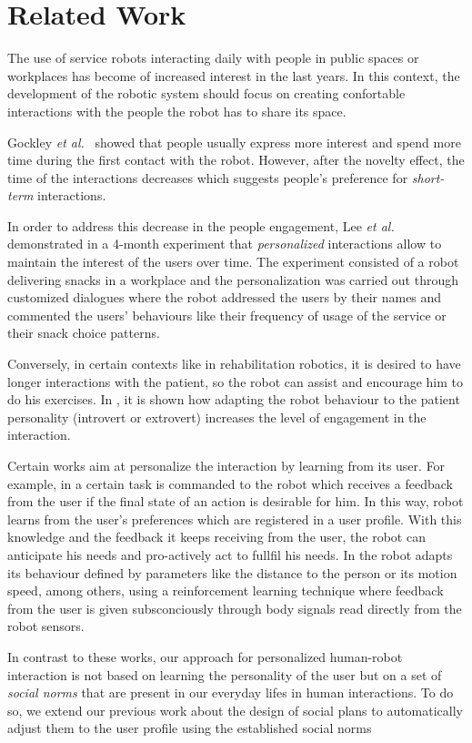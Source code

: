 \section{Related Work}

The use of service robots interacting daily with people in public
spaces or workplaces has become of increased interest in the last
years.
In this context, the development of the robotic system should focus on
creating confortable interactions with the people the robot has to
share its space.

Gockley \textit{et al.}~\cite{gockley2005} showed that people usually
express more interest and spend more time during the first contact
with the robot. However, after the novelty effect, the time of the
interactions decreases which suggests people's preference for
\textit{short-term} interactions.

In order to address this decrease in the people engagement, Lee
\textit{et al.}~\cite{Lee2012} demonstrated in a 4-month experiment
that \textit{personalized} interactions allow to maintain the interest of the
users over time.  The experiment consisted of a robot delivering
snacks in a workplace and the personalization was carried out through
customized dialogues where the robot addressed the users by their
names and commented the users' behaviours like their frequency of
usage of the service or their snack choice patterns.

Conversely, in certain contexts like in rehabilitation robotics, it is
desired to have longer interactions with the patient, so the robot can
assist and encourage him to do his exercises. In \cite{tapus2008}, it
is shown how adapting the robot behaviour to the patient personality
(introvert or extrovert) increases the level of engagement in the
interaction.

Certain works aim at personalize the interaction by learning from its
user. For example, in \cite{mason2011robot} a certain task is
commanded to the robot which receives a feedback from the user if the
final state of an action is desirable for him.  In this way, robot
learns from the user's preferences which are registered in a user
profile. With this knowledge and the feedback it keeps receiving from
the user, the robot can anticipate his needs and pro-actively act to
fullfil his needs.  In \cite{mitsunaga2008adapting} the robot adapts
its behaviour defined by parameters like the distance to the person or
its motion speed, among others, using a reinforcement learning technique
where feedback from the user is given subsconciously through body
signals read directly from the robot sensors.

In contrast to these works, our approach for personalized human-robot
interaction is not based on learning the personality of the user but
on a set of \textit{social norms} that are present in our everyday
lifes in human interactions.  To do so, we extend our previous work
\cite{Nardi14} about the design of social plans to automatically
adjust them to the user profile using the established social norms
